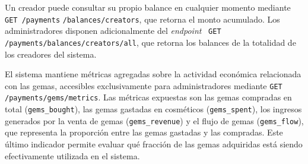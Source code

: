 \vspace{0.25cm}

Un creador puede consultar su propio balance en cualquier momento mediante \texttt{GET /payments} \texttt{/balances/creators},
que retorna el monto acumulado. Los administradores disponen adicionalmente del
\textit{endpoint} \, \texttt{GET /payments/balances/creators/all}, que retorna los balances de la totalidad de los
creadores del sistema.
\vspace{0.25cm}

El sistema mantiene métricas agregadas sobre la actividad económica relacionada con las gemas, accesibles
exclusivamente para administradores mediante \texttt{GET /payments/gems/metrics}. Las métricas expuestas son
las gemas compradas en total (\texttt{gems\_bought}), las gemas gastadas en cosméticos (\texttt{gems\_spent}),
los ingresos generados por la venta de gemas (\texttt{gems\_revenue}) y el flujo de gemas (\texttt{gems\_flow}),
que representa la proporción entre las gemas gastadas y las compradas. Este último indicador permite evaluar
qué fracción de las gemas adquiridas está siendo efectivamente utilizada en el sistema.
\vspace{0.25cm}

